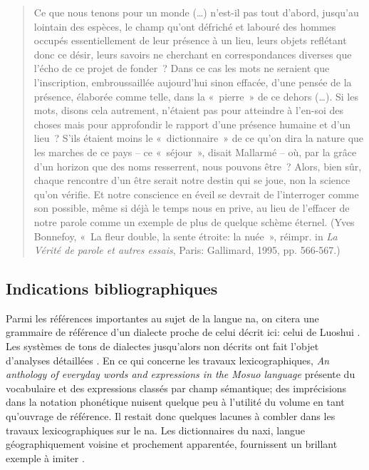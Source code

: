	\begin{quote}
    Ce que nous tenons pour un monde (…) n’est-il pas tout d’abord, jusqu’au lointain des espèces, le champ qu’ont défriché et labouré des hommes occupés essentiellement de leur présence à un lieu, leurs objets reflétant donc ce désir, leurs savoirs ne cherchant en correspondances diverses que l’écho de ce projet de fonder ? Dans ce cas les mots ne seraient que l’inscription, embroussaillée aujourd'hui sinon effacée, d’une pensée de la présence, élaborée comme telle, dans la « pierre » de ce dehors (…). Si les mots, disons cela autrement, n’étaient pas pour atteindre à l’en-soi des choses mais pour approfondir le rapport d’une présence humaine et d'un lieu ? S’ils étaient moins le « dictionnaire » de ce qu’on dira la nature que les marches de ce pays – ce « séjour », disait Mallarmé – où, par la grâce d'un horizon que des noms resserrent, nous pouvons être ? Alors, bien sûr, chaque rencontre d'un être serait notre destin qui se joue, non la science qu’on vérifie. Et notre conscience en éveil se devrait de l’interroger comme son possible, même si déjà le temps nous en prive, au lieu de l’effacer de notre parole comme un exemple de plus de quelque schème éternel. (Yves Bonnefoy, « La fleur double, la sente étroite: la nuée », réimpr. in \emph{La Vérité de parole et autres essais}, Paris: Gallimard, 1995, pp. 566-567.)
\end{quote}

\subsection*{Indications bibliographiques}

Parmi les références importantes au sujet de la langue na, on citera une grammaire de référence d'un dialecte proche de celui décrit ici: celui de Luoshui  \parencite{lidz2010}. Les systèmes de tons de dialectes jusqu'alors non décrits ont fait l'objet d'analyses détaillées \parencite{a2016,dobbsetal2016,michaud2017,fily_documentation_2022}. En ce qui concerne les travaux lexicographiques, \emph{An anthology of everyday words and expressions in the Mosuo language} \parencite{zhibaetal2013} présente du vocabulaire et des expressions classés par champ sémantique; des imprécisions dans la notation phonétique nuisent quelque peu à l'utilité du volume en tant qu'ouvrage de référence. Il restait donc quelques lacunes à combler dans les travaux lexicographiques sur le na. Les dictionnaires du naxi, langue géographiquement voisine et prochement apparentée, fournissent un brillant exemple à imiter \parencite{heetal2011,pinsonetal2012}.

